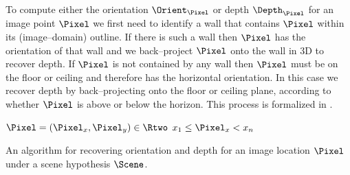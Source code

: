 To compute either the orientation $\Orient_{\Pixel}$ or depth
$\Depth_{\Pixel}$ for an image point $\Pixel$ we first need to
identify a wall that contains $\Pixel$ within its (image--domain)
outline. If there is such a wall then $\Pixel$ has the orientation of
that wall and we back--project $\Pixel$ onto the wall in 3D to recover
depth. If $\Pixel$ is not contained by any wall then $\Pixel$ must be
on the floor or ceiling and therefore has the horizontal
orientation. In this case we recover depth by back--projecting onto
the floor or ceiling plane, according to whether $\Pixel$ is above or
below the horizon. This process is formalized in
.

\begin{algorithm}[tb]
  \label{alg:comuting-from-scene}
        \begin{algorithmic}
          \REQUIRE $\Pixel=(\Pixel_x,\Pixel_y)\in\Rtwo$
          \REQUIRE $x_1 \leq \Pixel_x < x_n$
              \STATE{}
              \ELSE
              \ENDIF
              \RETURN
            \ENDIF
          \ENDFOR
        \end{algorithmic}
  \caption{An algorithm for recovering orientation and depth for an
    image location $\Pixel$ under a scene hypothesis $\Scene$.}
\end{algorithm}


